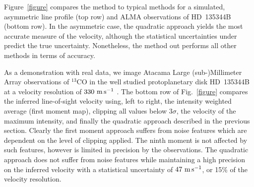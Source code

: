 \documentclass[rnaas]{aastex62}
\begin{document}
Figure~\ref{figure} compares the method to typical methods for a simulated, asymmetric line profile (top row) and ALMA observations of HD~135344B (bottom row). In the asymmetric case, the quadratic approach yields the most accurate measure of the velocity, although the statistical uncertainties under predict the true uncertainty. Nonetheless, the method out performs all other methods in terms of accuracy.

As a demonstration with real data, we image Atacama Large (sub-)Millimeter Array observations of $^{13}$CO in the well studied protoplanetary disk HD~135344B at a velocity resolution of $330~{\rm m\,s^{-1}}$ \citep[ALMA Project 2012.1.00158.S]{vanderMarel:2016} . The bottom row of Fig.~\ref{figure} compares the inferred line-of-sight velocity using, left to right, the intensity weighted average (first moment map), clipping all values below $3\sigma$, the velocity of the maximum intensity, and finally the quadratic approach described in the previous section. Clearly the first moment approach suffers from noise features which are dependent on the level of clipping applied. The ninth moment is not affected by such features, however is limited in precision by the observations. The quadratic approach does not suffer from noise features while maintaining a high precision on the inferred velocity with a statistical uncertainty of $47~{\rm m\,s^{-1}}$, or 15\% of the velocity resolution.


\end{document}
